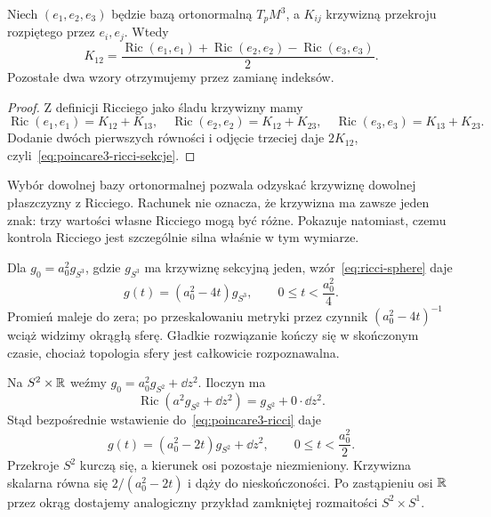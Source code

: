 \begin{stwierdzenie}
\label{prop:poincare3-ricci-sekcje}
Niech $(e_1,e_2,e_3)$ będzie bazą ortonormalną
$T_pM^3$, a $K_{ij}$ krzywizną przekroju rozpiętego
przez $e_i,e_j$. Wtedy
\begin{equation}\label{eq:poincare3-ricci-sekcje}
 K_{12}=\frac{\operatorname{Ric}(e_1,e_1)
              +\operatorname{Ric}(e_2,e_2)
              -\operatorname{Ric}(e_3,e_3)}{2}.
\end{equation}
Pozostałe dwa wzory otrzymujemy przez zamianę indeksów.
\end{stwierdzenie}
\begin{proof}
Z definicji Ricciego jako śladu krzywizny mamy
\[
 \operatorname{Ric}(e_1,e_1)=K_{12}+K_{13},\quad
 \operatorname{Ric}(e_2,e_2)=K_{12}+K_{23},\quad
 \operatorname{Ric}(e_3,e_3)=K_{13}+K_{23}.
\]
Dodanie dwóch pierwszych równości i odjęcie trzeciej
daje $2K_{12}$, czyli~\eqref{eq:poincare3-ricci-sekcje}.
\end{proof}

Wybór dowolnej bazy ortonormalnej pozwala odzyskać
krzywiznę dowolnej płaszczyzny z Ricciego. Rachunek
nie oznacza, że krzywizna ma zawsze jeden znak:
trzy wartości własne Ricciego mogą być różne.
Pokazuje natomiast, czemu kontrola Ricciego jest
szczególnie silna właśnie w tym wymiarze.

\begin{przyklad}
\label{prz:poincare3-kurczaca-sfera}
Dla $g_0=a_0^2g_{S^3}$, gdzie $g_{S^3}$ ma
krzywiznę sekcyjną jeden, wzór~\eqref{eq:ricci-sphere}
daje
\[
 g(t)=(a_0^2-4t)g_{S^3},\qquad
 0\leq t<\frac{a_0^2}{4}.
\]
Promień maleje do zera; po przeskalowaniu metryki
przez czynnik $(a_0^2-4t)^{-1}$ wciąż widzimy
okrągłą sferę. Gładkie rozwiązanie kończy się
w skończonym czasie, chociaż topologia sfery jest
całkowicie rozpoznawalna.
\end{przyklad}

\begin{przyklad}
\label{prz:poincare3-walec}
Na $S^2\times\mathbb{R}$ weźmy
$g_0=a_0^2g_{S^2}+\dd z^2$. Iloczyn ma
\[
 \operatorname{Ric}(a^2g_{S^2}+\dd z^2)
 =g_{S^2}+0\cdot\dd z^2.
\]
Stąd bezpośrednie wstawienie do~\eqref{eq:poincare3-ricci}
daje
\begin{equation}\label{eq:poincare3-walec}
 g(t)=(a_0^2-2t)g_{S^2}+\dd z^2,
 \qquad 0\leq t<\frac{a_0^2}{2}.
\end{equation}
Przekroje $S^2$ kurczą się, a kierunek osi pozostaje
niezmieniony. Krzywizna skalarna równa się
$2/(a_0^2-2t)$ i dąży do nieskończoności.
Po zastąpieniu osi $\mathbb{R}$ przez okrąg dostajemy
analogiczny przykład zamkniętej rozmaitości
$S^2\times S^1$.
\end{przyklad}

